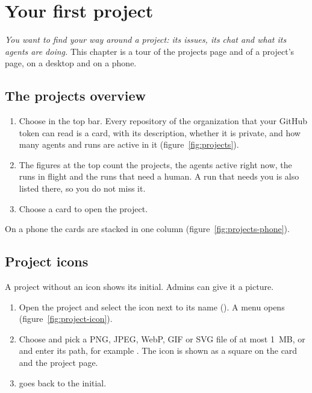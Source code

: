\chapter{Your first project}\label{ch:project}

\emph{You want to find your way around a project: its issues, its chat and what its agents are
doing.} This chapter is a tour of the projects page and of a project's page, on a desktop and on a
phone.

\section{The projects overview}\label{sec:projects}

\begin{enumerate}
  \item Choose  in the top bar. Every repository of the organization that your GitHub
    token can read is a card, with its description, whether it is private, and how many agents and
    runs are active in it (figure~\ref{fig:projects}).
  \item The figures at the top count the projects, the agents active right now, the runs in flight
    and the runs that need a human. A run that needs you is also listed there, so you do not miss it.
  \item Choose a card to open the project.
\end{enumerate}


On a phone the cards are stacked in one column (figure~\ref{fig:projects-phone}).


\section{Project icons}\label{sec:icons}

A project without an icon shows its initial. Admins can give it a picture.

\begin{enumerate}
  \item Open the project and select the icon next to its name (). A menu
    opens (figure~\ref{fig:project-icon}).
  \item Choose  and pick a PNG, JPEG, WebP, GIF or SVG file of at most 1~MB,
    or  and enter its path, for example
    . The icon is shown as a square on the card and the project page.
  \item {} goes back to the initial.
\end{enumerate}

